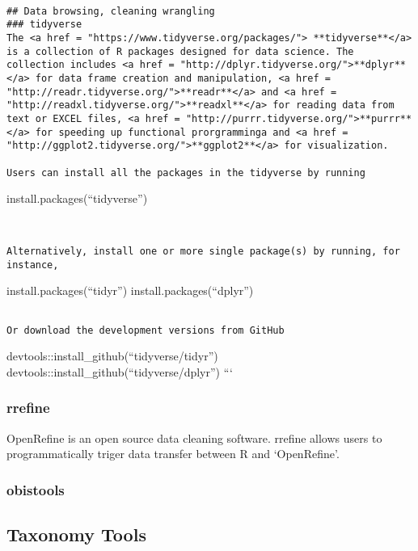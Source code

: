 \documentclass[]{article}
\begin{document}
\begin{verbatim}

## Data browsing, cleaning wrangling
### tidyverse
The <a href = "https://www.tidyverse.org/packages/"> **tidyverse**</a> is a collection of R packages designed for data science. The collection includes <a href = "http://dplyr.tidyverse.org/">**dplyr**</a> for data frame creation and manipulation, <a href = "http://readr.tidyverse.org/">**readr**</a> and <a href = "http://readxl.tidyverse.org/">**readxl**</a> for reading data from text or EXCEL files, <a href = "http://purrr.tidyverse.org/">**purrr**</a> for speeding up functional prorgramminga and <a href = "http://ggplot2.tidyverse.org/">**ggplot2**</a> for visualization. 

Users can install all the packages in the tidyverse by running 
\end{verbatim}

install.packages(``tidyverse'')

\begin{verbatim}


Alternatively, install one or more single package(s) by running, for instance,
\end{verbatim}

install.packages(``tidyr'') install.packages(``dplyr'')

\begin{verbatim}

Or download the development versions from GitHub
\end{verbatim}

devtools::install\_github(``tidyverse/tidyr'')
devtools::install\_github(``tidyverse/dplyr'') ```

\subsubsection{rrefine}\label{rrefine}

OpenRefine is an open source data cleaning software. rrefine allows
users to programmatically triger data transfer between R and
`OpenRefine'.

\subsubsection{obistools}\label{obistools}

\subsection{Taxonomy Tools}\label{taxonomy-tools}
\end{document}
